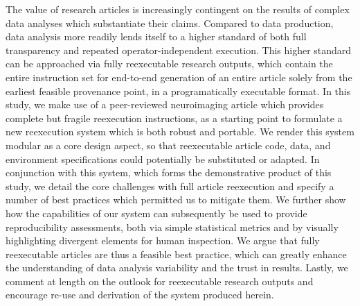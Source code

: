 The value of research articles is increasingly contingent on the results of complex data analyses which substantiate their claims.
Compared to data production, data analysis more readily lends itself to a higher standard of both full transparency and repeated operator-independent execution.
This higher standard can be approached via fully reexecutable research outputs, which contain the entire instruction set for end-to-end generation of an entire article solely from the earliest feasible provenance point, in a programatically executable format.
In this study, we make use of a peer-reviewed neuroimaging article which provides complete but fragile reexecution instructions, as a starting point to formulate a new reexecution system which is both robust and portable.
We render this system modular as a core design aspect, so that reexecutable article code, data, and environment specifications could potentially be substituted or adapted.
In conjunction with this system, which forms the demonstrative product of this study, we detail the core challenges with full article reexecution and specify a number of best practices which permitted us to mitigate them.
We further show how the capabilities of our system can subsequently be used to provide reproducibility assessments, both via simple statistical metrics and by visually highlighting divergent elements for human inspection.
We argue that fully reexecutable articles are thus a feasible best practice, which can greatly enhance the understanding of data analysis variability and the trust in results.
Lastly, we comment at length on the outlook for reexecutable research outputs and encourage re-use and derivation of the system produced herein.

